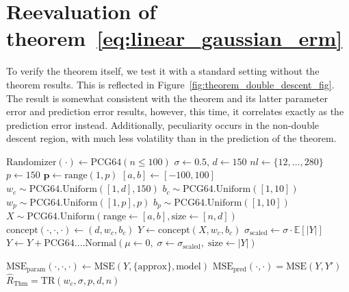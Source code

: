 \documentclass[
  journal=largetwo,
  year=2025,
  volume=37,
]{cup-journal}
\begin{document}
\clearpage
\appendix 

\section{Reevaluation of theorem~\ref{eq:linear_gaussian_erm}}

To verify the theorem itself, we test it with a standard setting without the theorem results. This is reflected in Figure~\ref{fig:theorem_double_descent_fig}. The result is somewhat consistent with the theorem and its latter parameter error and prediction error results, however, this time, it correlates exactly as the prediction error instead. Additionally, peculiarity occurs in the non-double descent region, with much less volatility than in the prediction of the theorem. 

\begin{algorithm}[h!]
    \caption{Linear regression with Gaussian white noise, full control.}
    \Begin
    {\small
    $\mathrm{Randomizer}(\cdot)\gets\mathrm{PCG64}(n\leq 100)$
    $\sigma\gets 0.5$, $d\gets 150$
    $nl\gets\{12,\dots,280\}$
    $p\gets 150$
    $\mathbf{p}\gets \mathrm{range}(1,p)$\; $[a,b]\gets [-100,100]$\;
    $w_{c}\sim \mathrm{PCG64}.\mathrm{Uniform}([1,d],150)$\; $b_{c}\sim \mathrm{PCG64}.\mathrm{Uniform}([1,10])$\;
    $w_{p}\sim \mathrm{PCG64}.\mathrm{Uniform}([1,p],p)$\; $b_{p}\sim \mathrm{PCG64}.\mathrm{Uniform}([1,10])$\;
    $X\sim\mathrm{PCG64}.\mathrm{Uniform}(\mathrm{range}\gets[a,b],\mathrm{size}\gets[n,d])$
    $\mathrm{concept}(\cdot,\cdot,\cdot)\gets (d,w_{c},b_{c})$\;
    $Y \gets \mathrm{concept}(X, w_{c},b_{c})$\;
    $\sigma_{\mathrm{scaled}} \gets \sigma \cdot \mathbb{E}\left[\lvert Y\rvert\right]$\;
    $Y \gets Y + \mathrm{PCG64}.…\mathrm{Normal}\left(\mu\gets 0,\;\sigma\gets \sigma_{\mathrm{scaled}},\;\mathrm{size}\gets\lvert Y\rvert\right)$ 

    $\mathrm{MSE}_{\mathrm{param}}(\cdot,\cdot,\cdot)\gets \mathrm{MSE}(Y,\{\mathrm{approx}\},\mathrm{model})$\;
    $\mathrm{MSE}_{\mathrm{pred}}(\cdot,\cdot)=\mathrm{MSE}(Y,Y')$
    $\hat{R}_{\mathrm{Thm}}=\mathrm{TR}(w_{c},\sigma,p,d,n)$\;
    }
    \label{algo:algo_reg_lin_1}
\end{algorithm}
\end{document}
